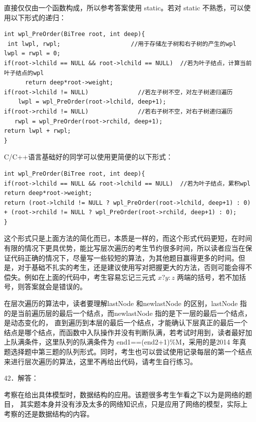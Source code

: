 \documentclass[UTF8,11pt]{ctexart}
\begin{document}
直接仅仅由一个函数构成，所以参考答案使用 static。若对 static 不熟悉，可以使用以下形式的递归：


\begin{Verbatim}[breaklines,breakanywhere,fontsize=\small]
int wpl_PreOrder(BiTree root, int deep){
 int lwpl, rwpl;                    //用于存储左子树和右子树的产生的wpl
lwpl = rwpl = 0;
if(root->lchild == NULL && root->lchild == NULL)  //若为叶子结点，计算当前叶子结点的wpl
      return deep*root->weight;
if(root->lchild != NULL)              //若左子树不空，对左子树递归遍历
    lwpl = wpl_PreOrder(root->lchild, deep+1);
if(root->rchild != NULL)              //若右子树不空，对右子树递归遍历
   rwpl = wpl_PreOrder(root->rchild, deep+1);
return lwpl + rwpl;
}
\end{Verbatim}

C/C++语言基础好的同学可以使用更简便的以下形式：


\begin{Verbatim}[breaklines,breakanywhere,fontsize=\small]
int wpl_PreOrder(BiTree root, int deep){
if(root->lchild == NULL && root->lchild == NULL)  //若为叶子结点，累积wpl
return deep*root->weight;
return (root->lchild != NULL ? wpl_PreOrder(root->lchild, deep+1) : 0)
+ (root->rchild != NULL ? wpl_PreOrder(root->rchild, deep+1) : 0);
}
\end{Verbatim}

这个形式只是上面方法的简化而已，本质是一样的，而这个形式代码更短，在时间有限的情况下更具优势，能比写层次遍历的考生节约很多时间，所以读者应当在保证代码正确的情况下，尽量写一些较短的算法，为其他题目赢得更多的时间。但是，对于基础不扎实的考生，还是建议使用写对把握更大的方法，否则可能会得不偿失。例如在上面的代码中，考生容易忘记三元式 \(\displaystyle x?y:z\) 两端的括号，若不加括号，则答案就会是错误的。


在层次遍历的算法中，读者要理解lastNode 和newlastNode 的区别，lastNode 指的是当前遍历层的最后一个结点，而newlastNode 指的是下一层的最后一个结点，是动态变化的， 直到遍历到本层的最后一个结点，才能确认下层真正的最后一个结点是哪个结点，而函数中入队操作并没有判断队满，若考试时用到，读者最好加上队满条件，这里队列的队满条件为 end1==(end2+1)\%M，采用的是2014 年真题选择题中第三题的队列形式。同时，考生也可以尝试使用记录每层的第一个结点来进行层次遍历的算法，这里不再给出代码，请考生自行练习。


42．解答：


考察在给出具体模型时，数据结构的应用。该题很多考生乍看之下以为是网络的题目， 其实题本身并没有涉及太多的网络知识点，只是应用了网络的模型，实际上考察的还是数据结构的内容。
\end{document}
